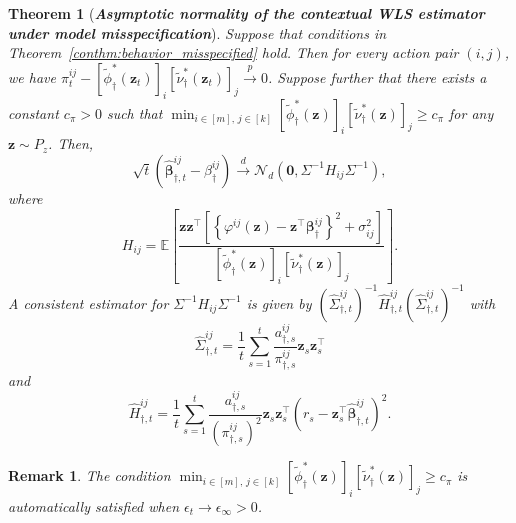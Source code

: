 \documentclass[12pt]{article}
\newtheorem{theorem}{Theorem}
\newtheorem{remark}{Remark}
\begin{document}
\begin{theorem}[\textbf{\emph{Asymptotic normality of the contextual WLS estimator under model misspecification}}]
\label{conthm:wls_normality_misspecified}
Suppose that conditions in Theorem~\ref{conthm:behavior_misspecified} hold. Then for every action pair $(i,j)$, we have $\pi_t^{ij} - [\widetilde{\phi}_\dagger^{\ast}(\bm z_t)]_i [\widetilde{\nu}_\dagger^{\ast}(\bm z_t)]_j \stackrel{p}{\to} 0$.
Suppose further that there exists a constant $c_\pi>0$ such that $\min_{i\in[m],\,j\in[k]} [\widetilde{\phi}_\dagger^\ast(\bm z)]_i [\widetilde{\nu}_\dagger^\ast(\bm z)]_j \ge c_\pi$ for any $\bm z\sim P_z$. Then,
\[
\sqrt t
\left(
\widehat{\bm\beta}_{\dagger,t}^{ij}
-
\beta_\dagger^{ij}
\right)
\stackrel{d}{\to}
\mathcal N_d
\left(
\bm 0,
\Sigma^{-1}H_{ij}\Sigma^{-1}
\right),
\]
where \[
H_{ij} =
\mathbb E
\left[
\frac{
\bm z\bm z^\top
\left[
\left\{
\varphi^{ij}(\bm z)-\bm z^\top\bm\beta_\dagger^{ij}
\right\}^2
+
\sigma_{ij}^2
\right]
}{
[\widetilde{\phi}_\dagger^\ast(\bm z)]_i
[\widetilde{\nu}_\dagger^\ast(\bm z)]_j
}
\right].
\]
A consistent estimator for $\Sigma^{-1} H_{ij} \Sigma^{-1}$ is given by $(\widehat{\Sigma}_{\dagger,t}^{ij})^{-1} \widehat H_{\dagger,t}^{ij} (\widehat{\Sigma}_{\dagger,t}^{ij})^{-1}$ with
\[
\widehat{\Sigma}_{\dagger,t}^{ij}
=
\frac{1}{t}
\sum_{s=1}^t
\frac{a_{\dagger,s}^{ij}}{\pi_{\dagger,s}^{ij}}
\bm z_s\bm z_s^\top
\]
and
\[
\widehat H_{\dagger,t}^{ij}
= \frac{1}{t}
\sum_{s=1}^t
\frac{a_{\dagger,s}^{ij}}{(\pi_{\dagger,s}^{ij})^2}
\bm z_s\bm z_s^\top
\left(
r_s -
\bm z_s^\top
\widehat{\bm\beta}_{\dagger,t}^{ij}
\right)^2.
\]
\end{theorem}
\begin{remark}
The condition $\min_{i\in[m],\,j\in[k]} [\widetilde{\phi}_\dagger^\ast(\bm z)]_i [\widetilde{\nu}_\dagger^\ast(\bm z)]_j \ge c_\pi$ is automatically satisfied when $\epsilon_t\to\epsilon_\infty>0$.
\end{remark}
\end{document}
